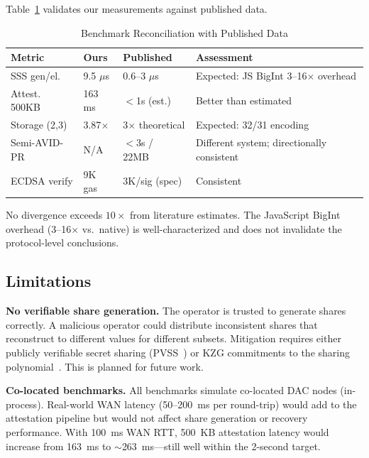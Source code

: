 Table~\ref{tab:reconcile} validates our measurements against published data.

\begin{table}[h]
\centering
\caption{Benchmark Reconciliation with Published Data}
\label{tab:reconcile}
\begin{tabular}{lllp{3cm}}
\toprule
\textbf{Metric} & \textbf{Ours} & \textbf{Published} & \textbf{Assessment} \\
\midrule
SSS gen/el. & 9.5 $\mu$s & 0.6--3 $\mu$s~\cite{shamir1979share}
  & Expected: JS BigInt 3--16$\times$ overhead \\
Attest. 500KB & 163 ms & $<$1s (est.) & Better than estimated \\
Storage (2,3) & 3.87$\times$ & 3$\times$ theoretical & Expected: 32/31 encoding \\
Semi-AVID-PR & N/A & $<$3s / 22MB~\cite{nazirkhanova2022semiavidpr}
  & Different system; directionally consistent \\
ECDSA verify & 9K gas & 3K/sig (spec) & Consistent \\
\bottomrule
\end{tabular}
\end{table}

No divergence exceeds $10\times$ from literature estimates. The JavaScript
BigInt overhead (3--16$\times$ vs.\ native) is well-characterized and does
not invalidate the protocol-level conclusions.

\subsection{Limitations}
\label{sec:limitations}

\textbf{No verifiable share generation.} The operator is trusted to generate
shares correctly. A malicious operator could distribute inconsistent shares
that reconstruct to different values for different subsets. Mitigation
requires either publicly verifiable secret sharing
(PVSS~\cite{gentry2022pvss}) or KZG commitments to the sharing
polynomial~\cite{feist2019das}. This is planned for future work.

\textbf{Co-located benchmarks.} All benchmarks simulate co-located DAC nodes
(in-process). Real-world WAN latency (50--200~ms per round-trip) would add
to the attestation pipeline but would not affect share generation or recovery
performance. With 100~ms WAN RTT, 500~KB attestation latency would increase
from 163~ms to $\sim$263~ms---still well within the 2-second target.

